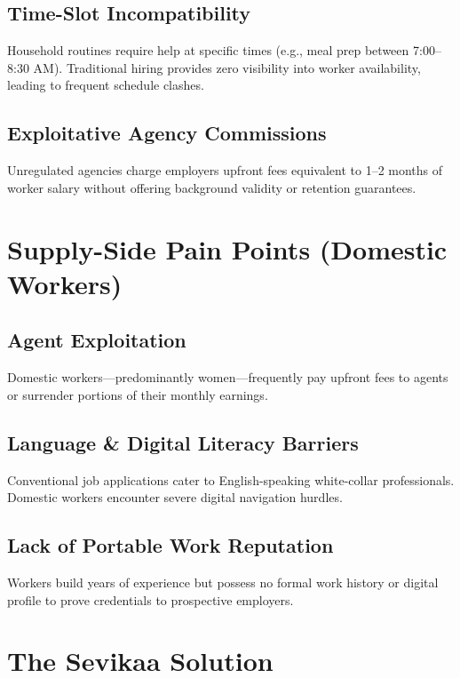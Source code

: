 \documentclass[11pt,a4paper]{article}
\begin{document}
\subsection{Time-Slot Incompatibility}
Household routines require help at specific times (e.g., meal prep between 7:00--8:30 AM). Traditional hiring provides zero visibility into worker availability, leading to frequent schedule clashes.

\subsection{Exploitative Agency Commissions}
Unregulated agencies charge employers upfront fees equivalent to 1--2 months of worker salary without offering background validity or retention guarantees.

\section{Supply-Side Pain Points (Domestic Workers)}

\subsection{Agent Exploitation}
Domestic workers—predominantly women—frequently pay upfront fees to agents or surrender portions of their monthly earnings.

\subsection{Language \& Digital Literacy Barriers}
Conventional job applications cater to English-speaking white-collar professionals. Domestic workers encounter severe digital navigation hurdles.

\subsection{Lack of Portable Work Reputation}
Workers build years of experience but possess no formal work history or digital profile to prove credentials to prospective employers.

\section{The Sevikaa Solution}
\end{document}
